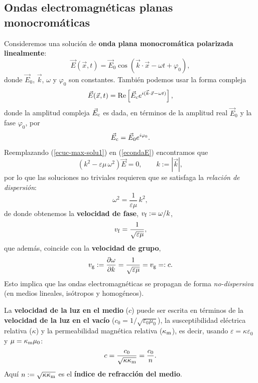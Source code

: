 \subsection{Ondas electromagnéticas planas monocromáticas}
Consideremos una solución de \textbf{onda plana monocromática polarizada linealmente}:
\begin{equation}
\vec{E}(\vec{x},t)=\vec{E}_0 \cos\left(\vec{k}\cdot\vec{x}-\omega t+\varphi_0\right),
\label{ecuc-max-solu1}%
\end{equation}
donde $\vec{E}_0$, $\vec{k}$, $\omega$ y $\varphi_0$ son constantes. También podemos usar la forma compleja
\begin{equation}
\vec{E}(\vec{x},t)=\operatorname{Re}\left[\vec{E}_{\rm c} e^{i(\vec{k}\cdot\vec{x}-\omega t)}\right],
\label{opmc}%
\end{equation}
donde la amplitud compleja $\vec{E}_{\rm c}$ es dada, en términos de la amplitud real $\vec{E}_0$ y la fase $\varphi_0$, por
\begin{equation}
\vec{E}_{\rm c} = \vec{E}_0 e^{i\varphi_0}.
\end{equation}
Reemplazando (\ref{ecuc-max-solu1}) en (\ref{econdaE}) encontramos que%
\begin{equation}
\left(k^2-\varepsilon\mu\,\omega^2\right)  \vec{E}=0, \qquad k:=|\vec{k}|,
\end{equation}
por lo que las soluciones no triviales requieren que se satisfaga la
\textit{relación de dispersión}:
\begin{equation}
\omega^2=\frac{1}{\varepsilon\mu}\,k^2, \label{rdoem}
\end{equation}
de donde obtenemos la \textbf{velocidad de fase},
$v_{\rm f}:=\omega/k$,
\begin{equation}
v_{\rm f}=\frac{1}{\sqrt{\varepsilon\mu}},
\end{equation}
que además, coincide con la \textbf{velocidad de grupo}, 
\begin{equation}
v_{\rm g} := \frac{\partial\omega}{\partial k}=\frac{1}{\sqrt{\varepsilon\mu}}=v_{\rm g}=:c.
\end{equation}
Esto implica que las ondas electromagnéticas se propagan de forma \textit{no-dispersiva} (en medios lineales, isótropos y homogéneos). 

La \textbf{velocidad de la luz en el medio} ($c$) puede ser escrita en términos de la \textbf{velocidad de la luz en el vacío} ($c_0=1/\sqrt{\varepsilon_0\mu_0}$), la susceptibilidad eléctrica relativa ($\kappa$) y la permeabilidad magnética relativa ($\kappa_{\rm m}$), es decir, usando $\varepsilon=\kappa\varepsilon_0$ y $\mu=\kappa_{\rm m}\mu_0$:
\begin{equation}
c=\frac{c_0}{\sqrt{\kappa\kappa_{\rm m}}}=\frac{c_0}{n}.
\end{equation}
Aquí $n:=\sqrt{\kappa\kappa_{\rm m}}$ es el \textbf{índice de refracción del medio}.

